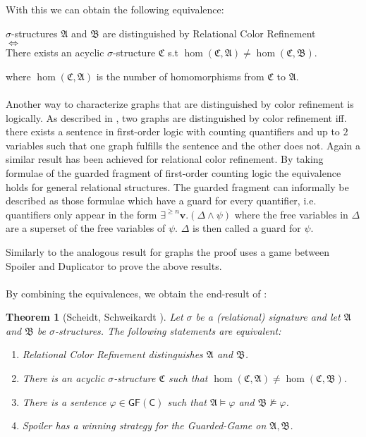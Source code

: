 \documentclass[a4paper,11pt,DIV=15]{scrartcl} %
\theoremstyle{plain}
\newtheorem{theorem}{Theorem}
\theoremstyle{definition}
\begin{document}
With this we can obtain the following equivalence:
\begin{center}
$\sigma$-structures $\mathfrak{A}$ and $\mathfrak{B}$ are distinguished by Relational Color Refinement \\ $\Leftrightarrow$ \\ There exists an acyclic $\sigma$-structure $\mathfrak{C}$ s.t $\hom(\mathfrak C, \mathfrak A)\neq\hom(\mathfrak C,\mathfrak B)$.
\end{center}
where $\hom(\mathfrak C,\mathfrak A)$ is the number of homomorphisms from $\mathfrak C$ to $\mathfrak A$.
\\ \\
Another way to characterize graphs that are distinguished by color refinement is logically.
As described in \cite{cai1992optimal}, two graphs are distinguished by color refinement iff. there exists a sentence in first-order logic with counting quantifiers and up to $2$ variables such that one graph fulfills the sentence and the other does not.
Again a similar result has been achieved for relational color refinement.
By taking formulae of the guarded fragment of first-order counting logic the equivalence holds for general relational structures.
The guarded fragment can informally be described as those formulae which have a guard for every quantifier, i.e. quantifiers only appear in the form $\exists^{\geq n}\mathbf v.(\Delta \land \psi)$ where the free variables in $\Delta$ are a superset of the free variables of $\psi$. $\Delta$ is then called a guard for $\psi$.

Similarly to the analogous result for graphs the proof uses a game between Spoiler and Duplicator to prove the above results.
\\ \\
By combining the equivalences, we obtain the end-result of \cite{scheidt2024color}:

\begin{theorem}[Scheidt, Schweikardt \cite{scheidt2024color}]
	Let $\sigma$ be a (relational) signature and let $\mathfrak A$ and $\mathfrak B$ be $\sigma$-structures. The following statements are equivalent:
	\begin{enumerate}
		\item Relational Color Refinement distinguishes $\mathfrak A$ and $\mathfrak B$.
		\item There is an acyclic $\sigma$-structure $\mathfrak C$ such that $\hom(\mathfrak C,\mathfrak A)\neq\hom(\mathfrak C,\mathfrak B)$.
		\item There is a sentence $\varphi\in \mathsf{GF(C)}$ such that $\mathfrak A\models\varphi$ and $\mathfrak B\not\models\varphi$.
		\item Spoiler has a winning strategy for the Guarded-Game on $\mathfrak A,\mathfrak B$.
	\end{enumerate}
	\label{RCRMainThm}
\end{theorem}
\end{document}
